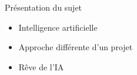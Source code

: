 \begin{frame}{Présentation du sujet}
	\begin{itemize}
		\item Intelligence artificielle
		\pause
		\item Approche différente d'un projet
		\pause
		\item Rêve de l'IA
	\end{itemize}
\end{frame}

